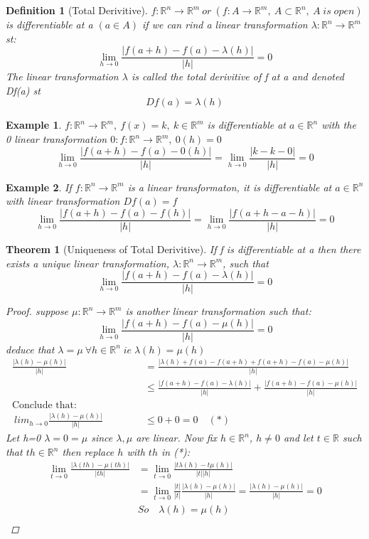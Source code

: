 \documentclass[12pt]{article}
\def\RR{\mathbb{R}}
\newtheorem{theorem}{Theorem}[section]
\newtheorem{definition}{Definition}[section]
\newtheorem{example}{Example}[section]
\begin{document}
\begin{definition}[Total Derivitive]\label{D:Total Derivitive}
$f:\RR^{n} \rightarrow \RR^{m}\: or \:(f:A \rightarrow \RR^{m}, \: A \subset \RR^{n}, \:A\;is\;open)$
is differentiable at a $(a \in A)$ if we can rind a linear transformation $ \lambda:\RR^{n} \rightarrow \RR^{m}$ st:
\[\lim_{h \to 0}\frac{|f(a+h) - f(a) - \lambda(h)|}{|h|} =0 \]
The linear transformation $\lambda$ is called the total derivitive of f at a and denoted Df(a) st
\[Df(a)=\lambda(h)\] 
\end{definition}

\begin{example} 
$f:\RR^{n} \rightarrow \RR^{m}, \: f(x)=k, \: k \in\RR^{m} $ is differentiable at $a\in\RR^{n}$ with the 0 linear transformation $0:f:\RR^{n} \rightarrow \RR^{m}, \: 0(h)=0$
\[\lim_{h \to 0}\frac{|f(a+h) - f(a) - 0(h)|}{|h|} = \lim_{h \to 0}\frac{|k - k - 0|}{|h|}= 0 \]
\end{example}

\begin{example}
If $f:\RR^{n} \rightarrow \RR^{m}$ is a linear transformaton, it is differentiable at $a\in\RR^{n}$ with linear transformation $Df(a) = f$
\[\lim_{h \to 0}\frac{|f(a+h) - f(a) - f(h)|}{|h|}= \lim_{h \to 0}\frac{|f(a+h -a -h)|}{|h|} = 0\]
\end{example}

\begin{theorem}[Uniqueness of Total Derivitive]\label{T:Uniqueness of Total Derivitive}
If f is differentiable at a then there exists a unique linear transformation, $ \lambda:\RR^{n} \rightarrow \RR^{m}$, such that
\[\lim_{h \to 0}\frac{|f(a+h) - f(a) - \lambda(h)|}{|h|} =0 \]
\begin{proof}
suppose $ \mu:\RR^{n} \rightarrow \RR^{m}$ is another linear transformation such that:
\[\lim_{h \to 0}\frac{|f(a+h) - f(a) - \mu(h)|}{|h|} =0 \]
deduce that $\lambda= \mu \:\forall h\in\RR^{n} \; ie\; \lambda(h)= \mu(h)$
\begin{align*}
\frac{|\lambda(h)- \mu(h)|}{|h|}&= \frac{|\lambda(h) +f(a) -f(a+h) +f(a+h) -f(a)- \mu(h)|}{|h|}\\
&\leq \frac{|f(a+h) -f(a) -\lambda(h)|}{|h|} +  \frac{|f(a+h) -f(a) -\mu(h)|}{|h|}\\
\text{Conclude that:} \qquad \qquad \qquad &\\
\:lim_{h \to 0}\frac{|\lambda(h)- \mu(h)|}{|h|} &\leq 0 + 0 =0 \quad (*)
\end{align*}
Let h=0 $\lambda= 0=\mu$ since $\lambda, \mu$ are linear. Now fix $h \in \RR^{n}$, $h\neq0$ and let $t\in\RR$ such that $th\in\RR^{n} $ then replace $h$ with $th$ in (*):
\begin{align*}
\lim_{t \to 0}\frac{|\lambda(th)- \mu(th)|}{|th|}&= \lim_{t \to 0}\frac{|t\lambda(h)- t\mu(h)|}{|t||h|}\\
&= \lim_{t \to 0}\frac{|t|}{|t|}\frac{|\lambda(h)- \mu(h)|}{|h|}= \frac{|\lambda(h)- \mu(h)|}{|h|} = 0\\
&So\quad \lambda(h)=\mu(h)\\
\end{align*}
\end{proof}
\end{theorem}
\end{document}
